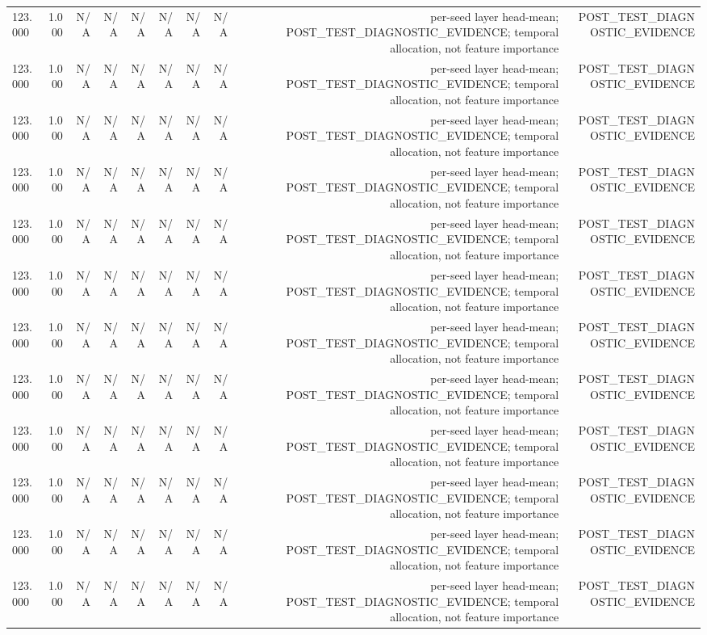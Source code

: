 \begin{table}[h!]
\begin{tabular}{lrrrrrrrrr}
123.000 & 1.000 & N/A & N/A & N/A & N/A & N/A & N/A & per-seed layer head-mean; POST\_TEST\_DIAGNOSTIC\_EVIDENCE; temporal allocation, not feature importance & POST\_TEST\_DIAGNOSTIC\_EVIDENCE \\
123.000 & 1.000 & N/A & N/A & N/A & N/A & N/A & N/A & per-seed layer head-mean; POST\_TEST\_DIAGNOSTIC\_EVIDENCE; temporal allocation, not feature importance & POST\_TEST\_DIAGNOSTIC\_EVIDENCE \\
123.000 & 1.000 & N/A & N/A & N/A & N/A & N/A & N/A & per-seed layer head-mean; POST\_TEST\_DIAGNOSTIC\_EVIDENCE; temporal allocation, not feature importance & POST\_TEST\_DIAGNOSTIC\_EVIDENCE \\
123.000 & 1.000 & N/A & N/A & N/A & N/A & N/A & N/A & per-seed layer head-mean; POST\_TEST\_DIAGNOSTIC\_EVIDENCE; temporal allocation, not feature importance & POST\_TEST\_DIAGNOSTIC\_EVIDENCE \\
123.000 & 1.000 & N/A & N/A & N/A & N/A & N/A & N/A & per-seed layer head-mean; POST\_TEST\_DIAGNOSTIC\_EVIDENCE; temporal allocation, not feature importance & POST\_TEST\_DIAGNOSTIC\_EVIDENCE \\
123.000 & 1.000 & N/A & N/A & N/A & N/A & N/A & N/A & per-seed layer head-mean; POST\_TEST\_DIAGNOSTIC\_EVIDENCE; temporal allocation, not feature importance & POST\_TEST\_DIAGNOSTIC\_EVIDENCE \\
123.000 & 1.000 & N/A & N/A & N/A & N/A & N/A & N/A & per-seed layer head-mean; POST\_TEST\_DIAGNOSTIC\_EVIDENCE; temporal allocation, not feature importance & POST\_TEST\_DIAGNOSTIC\_EVIDENCE \\
123.000 & 1.000 & N/A & N/A & N/A & N/A & N/A & N/A & per-seed layer head-mean; POST\_TEST\_DIAGNOSTIC\_EVIDENCE; temporal allocation, not feature importance & POST\_TEST\_DIAGNOSTIC\_EVIDENCE \\
123.000 & 1.000 & N/A & N/A & N/A & N/A & N/A & N/A & per-seed layer head-mean; POST\_TEST\_DIAGNOSTIC\_EVIDENCE; temporal allocation, not feature importance & POST\_TEST\_DIAGNOSTIC\_EVIDENCE \\
123.000 & 1.000 & N/A & N/A & N/A & N/A & N/A & N/A & per-seed layer head-mean; POST\_TEST\_DIAGNOSTIC\_EVIDENCE; temporal allocation, not feature importance & POST\_TEST\_DIAGNOSTIC\_EVIDENCE \\
123.000 & 1.000 & N/A & N/A & N/A & N/A & N/A & N/A & per-seed layer head-mean; POST\_TEST\_DIAGNOSTIC\_EVIDENCE; temporal allocation, not feature importance & POST\_TEST\_DIAGNOSTIC\_EVIDENCE \\
123.000 & 1.000 & N/A & N/A & N/A & N/A & N/A & N/A & per-seed layer head-mean; POST\_TEST\_DIAGNOSTIC\_EVIDENCE; temporal allocation, not feature importance & POST\_TEST\_DIAGNOSTIC\_EVIDENCE \\

\end{tabular}
\end{table}
